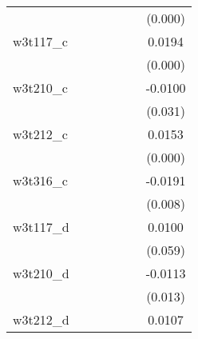 {\begin{tabular}{l*{6}{c}}
            &                     &                     &                     &                     &                     &     (0.000)         \\
[1em]
w3t117\_c    &                     &                     &                     &                     &                     &      0.0194\sym{***}\\
            &                     &                     &                     &                     &                     &     (0.000)         \\
[1em]
w3t210\_c    &                     &                     &                     &                     &                     &     -0.0100\sym{**} \\
            &                     &                     &                     &                     &                     &     (0.031)         \\
[1em]
w3t212\_c    &                     &                     &                     &                     &                     &      0.0153\sym{***}\\
            &                     &                     &                     &                     &                     &     (0.000)         \\
[1em]
w3t316\_c    &                     &                     &                     &                     &                     &     -0.0191\sym{***}\\
            &                     &                     &                     &                     &                     &     (0.008)         \\
[1em]
w3t117\_d    &                     &                     &                     &                     &                     &      0.0100\sym{*}  \\
            &                     &                     &                     &                     &                     &     (0.059)         \\
[1em]
w3t210\_d    &                     &                     &                     &                     &                     &     -0.0113\sym{**} \\
            &                     &                     &                     &                     &                     &     (0.013)         \\
[1em]
w3t212\_d    &                     &                     &                     &                     &                     &      0.0107\sym{***}\\

\end{tabular}}
